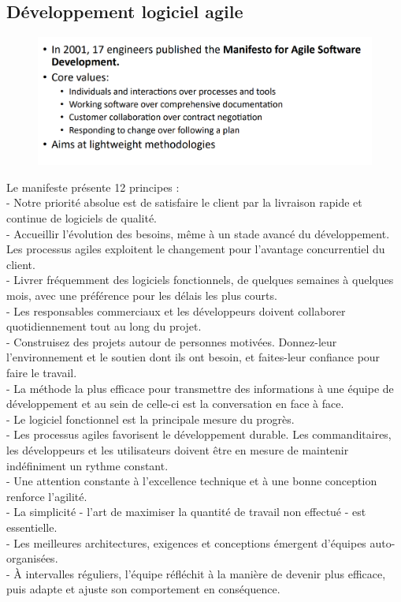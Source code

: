 \documentclass[12pt]{article}
\begin{document}
\subsection{Développement logiciel agile}
\begin{figure}[!hbtp]
	\centering
	\includegraphics[scale=0.75]{Capture10.PNG}
\end{figure}
Le manifeste présente 12 principes : \\
- Notre priorité absolue est de satisfaire le client par la livraison rapide et continue de logiciels de qualité.\\
- Accueillir l'évolution des besoins, même à un stade avancé du développement. Les processus agiles exploitent le changement pour l'avantage concurrentiel du client.\\
- Livrer fréquemment des logiciels fonctionnels, de quelques semaines à quelques mois, avec une préférence pour les délais les plus courts.\\
- Les responsables commerciaux et les développeurs doivent collaborer quotidiennement tout au long du projet.\\
- Construisez des projets autour de personnes motivées. Donnez-leur l'environnement et le soutien dont ils ont besoin, et faites-leur confiance
pour faire le travail.\\
- La méthode la plus efficace pour transmettre des informations à une équipe de développement et au sein de celle-ci est la conversation en face à face.\\
- Le logiciel fonctionnel est la principale mesure du progrès.\\
- Les processus agiles favorisent le développement durable. Les commanditaires, les développeurs et les utilisateurs doivent être en mesure de
maintenir indéfiniment un rythme constant.\\
- Une attention constante à l'excellence technique et à une bonne conception renforce l'agilité.\\
- La simplicité - l'art de maximiser la quantité de travail non effectué - est essentielle.\\
- Les meilleures architectures, exigences et conceptions émergent d'équipes auto-organisées.\\
- À intervalles réguliers, l'équipe réfléchit à la manière de devenir plus efficace, puis adapte et ajuste son comportement en conséquence.
\end{document}
